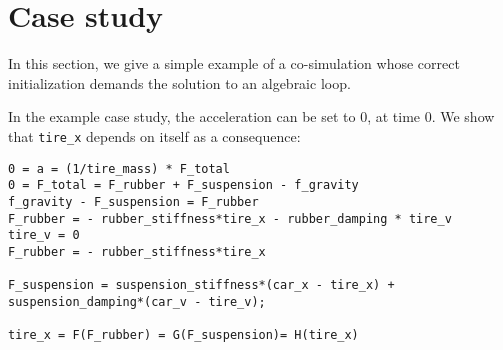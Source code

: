 \section{Case study}


In this section, we give a simple example of a co-simulation whose correct initialization demands the solution to an algebraic loop.

In the example case study, the acceleration can be set to 0, at time 0.
We show that \verb|tire_x| depends on itself as a consequence:
\begin{verbatim}
0 = a = (1/tire_mass) * F_total
0 = F_total = F_rubber + F_suspension - f_gravity
f_gravity - F_suspension = F_rubber
F_rubber = - rubber_stiffness*tire_x - rubber_damping * tire_v
tire_v = 0
F_rubber = - rubber_stiffness*tire_x

F_suspension = suspension_stiffness*(car_x - tire_x) + suspension_damping*(car_v - tire_v);

tire_x = F(F_rubber) = G(F_suspension)= H(tire_x)
\end{verbatim}
